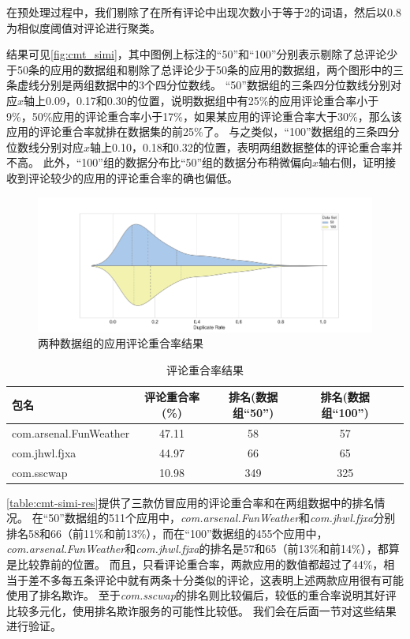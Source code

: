 在预处理过程中，我们剔除了在所有评论中出现次数小于等于2的词语，然后以0.8为相似度阈值对评论进行聚类。

结果可见\autoref{fig:cmt_simi}，其中图例上标注的``50''和``100''分别表示剔除了总评论少于50条的应用的数据组和剔除了总评论少于50条的应用的数据组，两个图形中的三条虚线分别是两组数据中的3个四分位数线。
``50''数据组的三条四分位数线分别对应$x$轴上0.09，0.17和0.30的位置，说明数据组中有25\%的应用评论重合率小于9\%，50\%应用的评论重合率小于17\%，如果某应用的评论重合率大于30\%，那么该应用的评论重合率就排在数据集的前25\%了。
与之类似，``100''数据组的三条四分位数线分别对应$x$轴上0.10，0.18和0.32的位置，表明两组数据整体的评论重合率并不高。
此外，``100''组的数据分布比``50''组的数据分布稍微偏向$x$轴右侧，证明接收到评论较少的应用的评论重合率的确也偏低。

\begin{figure}[htbp]
	\centering
	\includegraphics[width=\textwidth]{./Figures/edwin-cmt-simi-dist.png}
    \caption{两种数据组的应用评论重合率结果}
    \label{fig:cmt_simi}
\end{figure}

\begin{table}[htbp]
	\renewcommand{\arraystretch}{1}
	\small
	\centering
	\caption{评论重合率结果}
	\vspace{1mm}
	\begin{tabular}{lcccc}
		\toprule
		包名 & 评论重合率(\%) & 排名(数据组``50'') & 排名(数据组``100'') \\
		\midrule
		com.arsenal.FunWeather & 47.11 & 58 & 57 \\
		\rowcolor{gray!15} com.jhwl.fjxa & 44.97 & 66 & 65 \\
		com.sscwap & 10.98 & 349 & 325 \\
		\bottomrule
	\end{tabular}
	\label{table:cmt-simi-res}
\end{table}

\autoref{table:cmt-simi-res}提供了三款仿冒应用的评论重合率和在两组数据中的排名情况。
在``50''数据组的511个应用中，\emph{com.arsenal.FunWeather}和\emph{com.jhwl.fjxa}分别排名58和66（前11\%和前13\%），而在``100''数据组的455个应用中，\emph{com.arsenal.FunWeather}和\emph{com.jhwl.fjxa}的排名是57和65（前13\%和前14\%），都算是比较靠前的位置。
而且，只看评论重合率，两款应用的数值都超过了44\%，相当于差不多每五条评论中就有两条十分类似的评论，这表明上述两款应用很有可能使用了排名欺诈。
至于\emph{com.sscwap}的排名则比较偏后，较低的重合率说明其好评比较多元化，使用排名欺诈服务的可能性比较低。
我们会在后面一节对这些结果进行验证。

